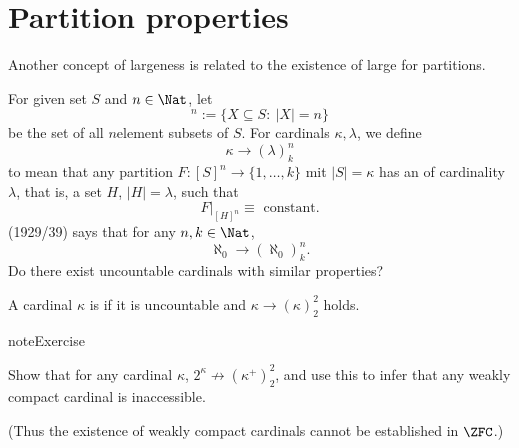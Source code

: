 \documentclass[letterpaper,10pt,english]{jupyterBook}
\begin{document}
\section{Partition properties}
\label{\detokenize{large_cardinals:partition-properties}}
\sphinxAtStartPar
Another concept of largeness is related to the existence of large  for partitions.

\sphinxAtStartPar
For given set \(S\) and \(n \in \Nat\), let
\begin{equation*}
	[S]^n := \{ X \subseteq S \colon \: |X| = n \} 
\end{equation*}
\sphinxAtStartPar
be the set of all \(n\)\sphinxhyphen{}element subsets of \(S\). For cardinals \(\kappa, \lambda\), we define
\begin{equation*}
	\kappa \to (\lambda)^n_k 
\end{equation*}
\sphinxAtStartPar
to mean that any partition \(F: [S]^n \to \{1, \dots, k\}\) mit \(|S| = \kappa\) has an   of cardinality \(\lambda\), that is, a set \(H\), \(|H| = \lambda\), such that
\begin{equation*}
	F|_{[H]^n} \equiv \text{ constant}. 
\end{equation*}
\sphinxAtStartPar
{} (1929/39) says that for any \(n,k \in \Nat\),
\begin{equation*}
	\aleph_0 \to (\aleph_0)^n_k. 
\end{equation*}
\sphinxAtStartPar
Do there exist uncountable cardinals with similar properties?

\sphinxAtStartPar
A cardinal \(\kappa\) is  if it is uncountable and \(\kappa \to (\kappa)^2_2\) holds.

\begin{sphinxadmonition}{note}{Exercise}

\sphinxAtStartPar
Show that for any cardinal \(\kappa\), \(2^\kappa \nrightarrow (\kappa^+)^2_2\), and use this to infer that any weakly compact cardinal is inaccessible.

\sphinxAtStartPar
(Thus the existence of weakly compact cardinals cannot be established in \(\ZFC\).)
\end{sphinxadmonition}
\end{document}
